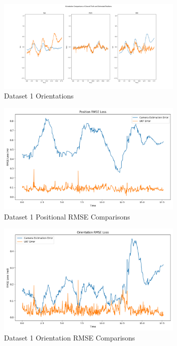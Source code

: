 \documentclass{article}
\begin{document}
\begin{figure}[H]
    \centering
    \includegraphics[width=0.8\textwidth]{./imgs/task4/studentdata1_ukf_orientations.png}
    \caption{Dataset 1 Orientations}
\end{figure}

\begin{figure}[H]
    \centering
    \includegraphics[width=0.8\textwidth]{./imgs/task4/studentdata1_ukf_position_rmse.png}
    \caption{Dataset 1 Positional RMSE Comparisons}
\end{figure}

\begin{figure}[H]
    \centering
    \includegraphics[width=0.8\textwidth]{./imgs/task4/studentdata1_ukf_orientation_rmse.png}
    \caption{Dataset 1 Orientation RMSE Comparisons}
\end{figure}
\end{document}
